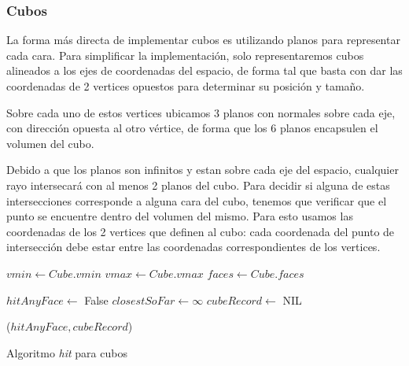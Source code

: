 \subsubsection{Cubos}

La forma más directa de implementar cubos es utilizando planos para representar
cada cara. Para simplificar la implementación, solo representaremos cubos
alineados a los ejes de coordenadas del espacio, de forma tal que basta con dar
las coordenadas de 2 vertices opuestos para determinar su posición y tamaño.

Sobre cada uno de estos vertices ubicamos 3 planos con normales sobre cada eje,
con dirección opuesta al otro vértice, de forma que los 6 planos encapsulen el
volumen del cubo.


Debido a que los planos son infinitos y estan sobre cada eje del espacio,
cualquier rayo intersecará con al menos 2 planos del cubo. Para decidir si
alguna de estas intersecciones corresponde a alguna cara del cubo, tenemos que
verificar que el punto se encuentre dentro del volumen del mismo. Para esto
usamos las coordenadas de los 2 vertices que definen al cubo: cada coordenada
del punto de intersección debe estar entre las coordenadas correspondientes de
los vertices.

\begin{algorithm}[H]
\begin{algorithmic}[1]
    \State $vmin \gets Cube.vmin$ 
    \State $vmax \gets Cube.vmax$
    \State $faces \gets Cube.faces$

    \State $hitAnyFace \gets$ False
    \State $closestSoFar \gets \infty$
    \State $cubeRecord \gets$ NIL

     

        \EndIf
    \EndFor

    \State \Return ($hitAnyFace, cubeRecord$)
\EndFunction
\end{algorithmic}
\caption{Algoritmo \textit{hit} para cubos}
\label{alg:box-hit}
\end{algorithm}


